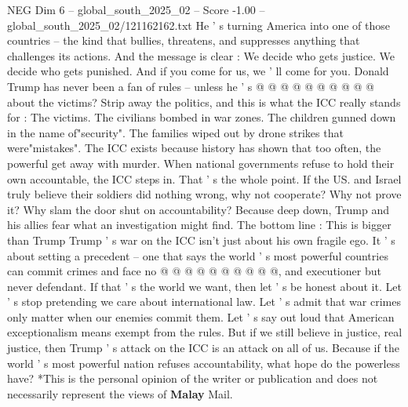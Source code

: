 \begin{textsample}{NEG Dim 6 – global\_south\_2025\_02 – Score -1.00 – global\_south\_2025\_02/121162162.txt}
He ' s turning America into one of those countries -- the kind that bullies, threatens, and suppresses anything that challenges its actions.
And the message is clear : We decide who gets justice.
We decide who gets punished.
And if you come for us, we ' ll come for you.
Donald Trump has never been a fan of rules -- unless he ' s @ @ @ @ @ @ @ @ @ @ about the victims?
Strip away the politics, and this is what the ICC really stands for : The victims.
The civilians bombed in war zones.
The children gunned down in the name of"security".
The families wiped out by drone strikes that were"mistakes".
The ICC exists because history has shown that too often, the powerful get away with murder.
When national governments refuse to hold their own accountable, the ICC steps in.
That ' s the whole point.
If the US. and Israel truly believe their soldiers did nothing wrong, why not cooperate?
Why not prove it?
Why slam the door shut on accountability?
Because deep down, Trump and his allies fear what an investigation might find.
The bottom line : This is bigger than Trump Trump ' s war on the ICC isn't just about his own fragile ego.
It ' s about setting a precedent -- one that says the world ' s most powerful countries can commit crimes and face no @ @ @ @ @ @ @ @ @ @, and executioner but never defendant.
If that ' s the world we want, then let ' s be honest about it.
Let ' s stop pretending we care about international law.
Let ' s admit that war crimes only matter when our enemies commit them.
Let ' s say out loud that American exceptionalism means exempt from the rules.
But if we still believe in justice, real justice, then Trump ' s attack on the ICC is an attack on all of us.
Because if the world ' s most powerful nation refuses accountability, what hope do the powerless have? *This is the personal opinion of the writer or publication and does not necessarily represent the views of \textbf{Malay} Mail.

\end{textsample}
